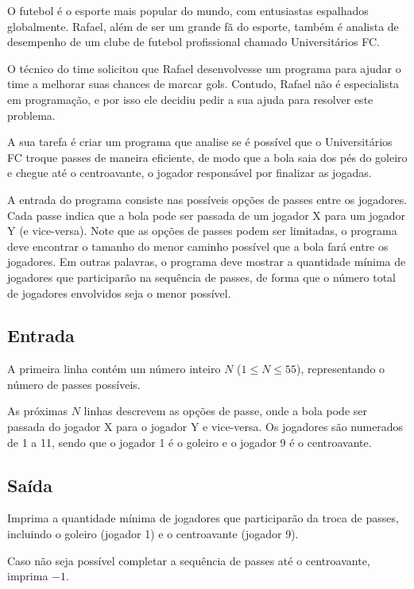 O futebol é o esporte mais popular do mundo, com entusiastas espalhados globalmente. Rafael, além de ser um grande fã do esporte, também é analista de desempenho de um clube de futebol profissional chamado Universitários FC.

O técnico do time solicitou que Rafael desenvolvesse um programa para ajudar o time a melhorar suas chances de marcar gols. Contudo, Rafael não é especialista em programação, e por isso ele decidiu pedir a sua ajuda para resolver este problema.

A sua tarefa é criar um programa que analise se é possível que o Universitários FC troque passes de maneira eficiente, de modo que a bola saia dos pés do goleiro e chegue até o centroavante, o jogador responsável por finalizar as jogadas.

A entrada do programa consiste nas possíveis opções de passes entre os jogadores. Cada passe indica que a bola pode ser passada de um jogador X para um jogador Y (e vice-versa). Note que as opções de passes podem ser limitadas, o programa deve encontrar o tamanho do menor caminho possível que a bola fará entre os jogadores. Em outras palavras, o programa deve mostrar a quantidade mínima de jogadores que participarão na sequência de passes, de forma que o número total de jogadores envolvidos seja o menor possível.

\subsection*{Entrada}

A primeira linha contém um número inteiro $N$ ($1 \leq N \leq 55$), representando o número de passes possíveis.

As próximas $N$ linhas descrevem as opções de passe, onde a bola pode ser passada do jogador X para o jogador Y e vice-versa. Os jogadores são numerados de 1 a 11, sendo que o jogador 1 é o goleiro e o jogador 9 é o centroavante.

\subsection*{Saída}

Imprima a quantidade mínima de jogadores que participarão da troca de passes, incluindo o goleiro (jogador 1) e o centroavante (jogador 9).

Caso não seja possível completar a sequência de passes até o centroavante, imprima $-1$.

